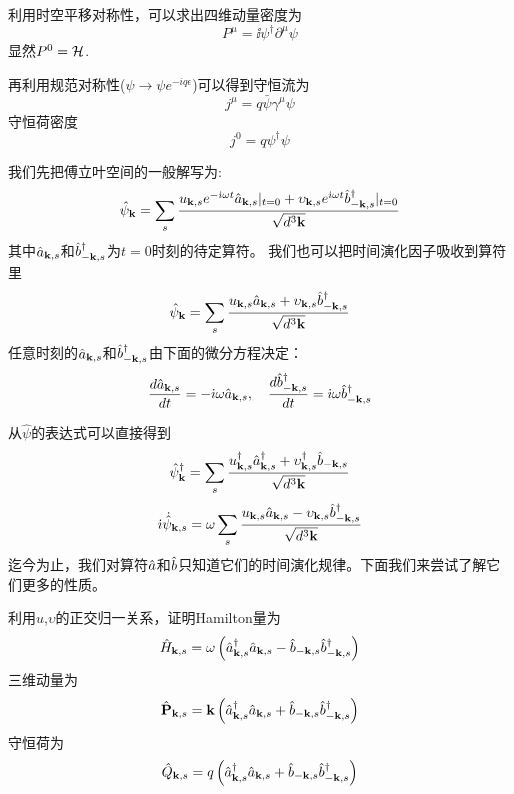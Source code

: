 \documentclass[CJK]{beamer}
\begin{document}
\begin{frame}
\bch
利用时空平移对称性，可以求出四维动量密度为
$$P^\mu = \ii\psi^\dagger \partial^\mu \psi$$
显然$P^0 = {\mathcal{H}}$.

再利用规范对称性($\psi \rightarrow \psi e^{-iq\epsilon}$)可以得到守恒流为
$$j^\mu = q \bar\psi \gamma^\mu \psi$$
守恒荷密度
$$j^0 =  q\psi^\dagger\psi$$
\ech
\end{frame}


\begin{frame}
\bch
我们先把傅立叶空间的一般解写为:
$$\hat\psi_{{\mathbf{k}}} = \sum_{s}\frac{u_{{\mathbf{k}},s}e^{-{\dot{\imath}} \omega t} {\hat{a}}_{{\mathbf{k}},s}|_{t=0} + \upsilon_{{\mathbf{k}},s}e^{{\dot{\imath}} \omega t} {\hat{b}^\dagger}_{-{\mathbf{k}},s}|_{t=0}}{\sqrt{d^3{\mathbf{k}}}}$$
其中${\hat{a}}_{{\mathbf{k}},s}$和${\hat{b}^\dagger}_{-{\mathbf{k}},s}$为$t=0$时刻的待定算符。
我们也可以把时间演化因子吸收到算符里
$$\hat\psi_{{\mathbf{k}}} = \sum_{s}\frac{u_{{\mathbf{k}},s} {\hat{a}}_{{\mathbf{k}},s} + \upsilon_{{\mathbf{k}},s} {\hat{b}^\dagger}_{-{\mathbf{k}},s}}{\sqrt{d^3{\mathbf{k}}}}$$
任意时刻的${\hat{a}}_{{\mathbf{k}},s}$和${\hat{b}^\dagger}_{-{\mathbf{k}},s}$由下面的微分方程决定：
$$\frac{d{\hat{a}}_{{\mathbf{k}},s}}{dt} = - {\dot{\imath}}\omega {\hat{a}}_{{\mathbf{k}},s},\ \ \ \frac{d{\hat{b}^\dagger}_{-{\mathbf{k}},s}}{dt} = {\dot{\imath}}\omega {\hat{b}^\dagger}_{-{\mathbf{k}},s}$$
\ech
\end{frame}

\begin{frame}
\bch
从$\hat\psi$的表达式可以直接得到
$$\hat\psi^\dagger_{{\mathbf{k}}} = \sum_{s}\frac{u^\dagger_{{\mathbf{k}},s} {\hat{a}^\dagger}_{{\mathbf{k}},s} + \upsilon^\dagger_{{\mathbf{k}},s} {\hat{b}}_{-{\mathbf{k}},s}}{\sqrt{d^3{\mathbf{k}}}}$$
$${\dot{\imath}} \dot{\hat\psi}_{{\mathbf{k}},s} = \omega  \sum_{s}  \frac{u_{{\mathbf{k}},s}{\hat{a}}_{{\mathbf{k}},s} - \upsilon_{{\mathbf{k}},s}{\hat{b}^\dagger}_{-{\mathbf{k}},s}}{\sqrt{d^3{\mathbf{k}}}} $$
迄今为止，我们对算符${\hat{a}}$和${\hat{b}}$只知道它们的时间演化规律。下面我们来尝试了解它们更多的性质。
\ech
\end{frame}

\begin{frame}
\bch
利用$u$,$\upsilon$的正交归一关系，证明Hamilton量为
$$\hat{H}_{{\mathbf{k}},s} =  \omega\left({\hat{a}^\dagger}_{{\mathbf{k}},s}{\hat{a}}_{{\mathbf{k}},s} - {\hat{b}}_{-{\mathbf{k}},s}{\hat{b}^\dagger}_{-{\mathbf{k}},s} \right)$$
三维动量为
$$\hat{\mathbf{P}}_{{\mathbf{k}},s} =  {\mathbf{k}}\left({\hat{a}^\dagger}_{{\mathbf{k}},s}{\hat{a}}_{{\mathbf{k}},s} + {\hat{b}}_{-{\mathbf{k}},s}{\hat{b}^\dagger}_{-{\mathbf{k}},s} \right)$$
守恒荷为
$$\hat{Q}_{{\mathbf{k}},s} =  q\left({\hat{a}^\dagger}_{{\mathbf{k}},s}{\hat{a}}_{{\mathbf{k}},s} + {\hat{b}}_{-{\mathbf{k}},s}{\hat{b}^\dagger}_{-{\mathbf{k}},s} \right)$$
\ech
\end{frame}
\end{document}
